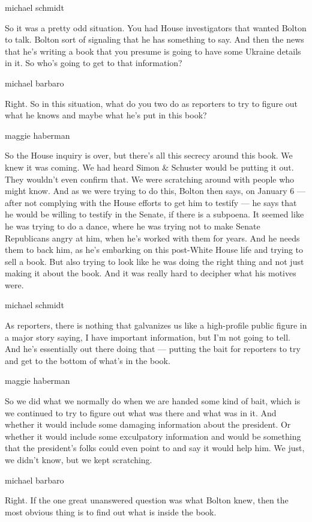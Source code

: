 michael schmidt

So it was a pretty odd situation. You had House investigators that
wanted Bolton to talk. Bolton sort of signaling that he has something to
say. And then the news that he's writing a book that you presume is
going to have some Ukraine details in it. So who's going to get to that
information?

michael barbaro

Right. So in this situation, what do you two do as reporters to try to
figure out what he knows and maybe what he's put in this book?

maggie haberman

So the House inquiry is over, but there's all this secrecy around this
book. We knew it was coming. We had heard Simon \& Schuster would be
putting it out. They wouldn't even confirm that. We were scratching
around with people who might know. And as we were trying to do this,
Bolton then says, on January 6 --- after not complying with the House
efforts to get him to testify --- he says that he would be willing to
testify in the Senate, if there is a subpoena. It seemed like he was
trying to do a dance, where he was trying not to make Senate Republicans
angry at him, when he's worked with them for years. And he needs them to
back him, as he's embarking on this post-White House life and trying to
sell a book. But also trying to look like he was doing the right thing
and not just making it about the book. And it was really hard to
decipher what his motives were.

michael schmidt

As reporters, there is nothing that galvanizes us like a high-profile
public figure in a major story saying, I have important information, but
I'm not going to tell. And he's essentially out there doing that ---
putting the bait for reporters to try and get to the bottom of what's in
the book.

maggie haberman

So we did what we normally do when we are handed some kind of bait,
which is we continued to try to figure out what was there and what was
in it. And whether it would include some damaging information about the
president. Or whether it would include some exculpatory information and
would be something that the president's folks could even point to and
say it would help him. We just, we didn't know, but we kept scratching.

michael barbaro

Right. If the one great unanswered question was what Bolton knew, then
the most obvious thing is to find out what is inside the book.

